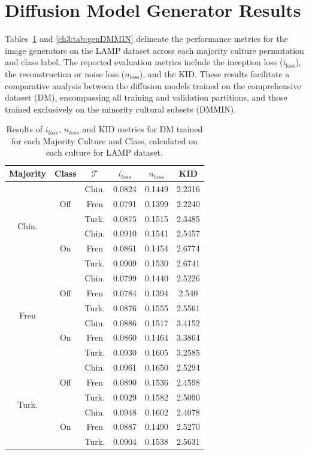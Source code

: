 \section{Diffusion Model Generator Results}
\label{ch3:sec:diff_model_gen_res}
Tables~\ref{ch3:tab:genDM} and \ref{ch3:tab:genDMMIN} delineate the performance metrics for the image generators on the LAMP dataset across each majority culture permutation and class label. 
The reported evaluation metrics include the inception loss ($i_{\text{loss}}$), the reconstruction or noise loss ($n_{\text{loss}}$), and the KID. 
These results facilitate a comparative analysis between the diffusion models trained on the comprehensive dataset (DM), encompassing all training and validation partitions, and those trained exclusively on the minority cultural subsets (DMMIN).
%
\begin{table}[]
\centering
\begin{tabular}{c|c|c|c|c|c}
    \textbf{Majority} & \textbf{Class} & \textbf{$\mathcal{T}$} & \textbf{$i_{loss}$} & \textbf{$n_{loss}$} & \textbf{KID} \\
    \toprule
\multirow{6}{*}{Chin.} & \multirow{3}{*}{Off} & Chin. & 0.0824 & 0.1449 & 2.2316 \\
 &  & Fren & 0.0791 & 0.1399 & 2.2240  \\
 &  & Turk. & 0.0875 & 0.1515 & 2.3485  \\
\hhline{~-----}
 & \multirow{3}{*}{On} & Chin. & 0.0910 & 0.1541 & 2.5457  \\
 &  & Fren & 0.0861 & 0.1454 & 2.6774  \\
 &  & Turk. & 0.0909 & 0.1530 & 2.6741 \\
\midrule
\multirow{6}{*}{Fren} & \multirow{3}{*}{Off} & Chin. & 0.0799 & 0.1440 & 2.5226  \\
 &  & Fren & 0.0784 & 0.1394 & 2.540  \\
 &  & Turk. & 0.0876 & 0.1555 & 2.5561 \\
\hhline{~-----}
 & \multirow{3}{*}{On} & Chin. & 0.0886 & 0.1517 & 3.4152  \\
 &  & Fren & 0.0860 & 0.1464 & 3.3864  \\
 &  & Turk. & 0.0930 & 0.1605 & 3.2585 \\
\midrule
\multirow{6}{*}{Turk.} & \multirow{3}{*}{Off} & Chin. & 0.0961 & 0.1650 & 2.5294  \\
 &  & Fren & 0.0890 & 0.1536 & 2.4598  \\
 &  & Turk. & 0.0929 & 0.1582 & 2.5090  \\
\hhline{~-----}
 & \multirow{3}{*}{On} & Chin. & 0.0948 & 0.1602 & 2.4078 \\
 &  & Fren & 0.0887 & 0.1490 & 2.5270 \\
 &  & Turk. & 0.0904 & 0.1538 & 2.5631  \\
\bottomrule
    \end{tabular}
    \caption{Results of $i_{loss}$, $n_{loss}$ and KID metrics for DM trained for each Majority Culture and Class, calculated on each culture for LAMP dataset.}
    \label{ch3:tab:genDM}
\end{table}

